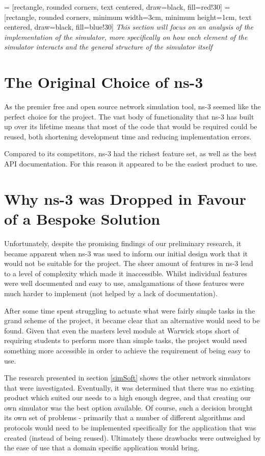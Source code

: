  = [rectangle, rounded corners, text centered, draw=black, fill=red!30]
 = [rectangle, rounded corners, minimum width=3cm, minimum height=1cm, text centered, draw=black, fill=blue!30]
\emph{This section will focus on an analysis of the implementation of the simulator, more specifically on how each element of the simulator interacts and the general structure of the simulator itself}

\section{The Original Choice of ns-3}
\label{ns3decision}
As the premier free and open source network simulation tool, ns-3 seemed like the perfect choice for the project. The vast body of functionality that ns-3 has built up over its lifetime means that most of the code that would be required could be reused, both shortening development time and reducing implementation errors.

Compared to its competitors, ns-3 had the richest feature set, as well as the best API documentation. For this reason it appeared to be the easiest product to use.

\section{Why ns-3 was Dropped in Favour of a Bespoke Solution}
Unfortunately, despite the promising findings of our preliminary research, it became apparent when ns-3  was used to inform our initial design work that it would not be suitable for the project. The sheer amount of features in ns-3 lead to a level of complexity which made it inaccessible. Whilst individual features were well documented and easy to use, amalgamations of these features were much harder to implement (not helped by a lack of documentation).

After some time spent struggling to actuate what were fairly simple tasks in the grand scheme of the project, it became clear that an alternative would need to be found. Given that even the masters level module at Warwick stops short of requiring students to perform more than simple tasks, the project would need something more accessible in order to achieve the requirement of being easy to use.

The research presented in section \ref{simSoft} shows the other network simulators that were investigated. Eventually, it was determined that there was no existing product which suited our needs to a high enough degree, and that creating our own simulator was the best option available. Of course, such a decision brought its own set of problems - primarily that a number of different algorithms and protocols would need to be implemented specifically for the application that was created (instead of being reused). Ultimately these drawbacks were outweighed by the ease of use that a domain specific application would bring.

